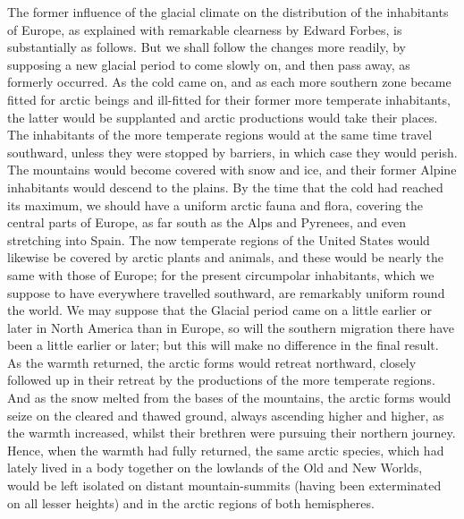 \indent The former influence of the glacial climate on the distribution of the inhabitants of Europe, as explained with remarkable clearness by Edward Forbes, is substantially as follows. But we shall follow the changes more readily, by supposing a new glacial period to come slowly on, and then pass away, as formerly occurred. As the cold came on, and as each more southern zone became fitted for arctic beings and ill-fitted for their former more temperate inhabitants, the latter would be supplanted and arctic productions would take their places. The inhabitants of the more temperate regions would at the same time travel southward, unless they were stopped by barriers, in which case they would perish. The mountains would become covered with snow and ice, and their former Alpine inhabitants would descend to the plains. By the time that the cold had reached its maximum, we should have a uniform arctic fauna and flora, covering the central parts of Europe, as far south as the Alps and Pyrenees, and even stretching into Spain. The now temperate regions of the United States would likewise be covered by arctic plants and animals, and these would be nearly the same with those of Europe; for the present circumpolar inhabitants, which we suppose to have everywhere travelled southward, are remarkably uniform round the world. We may suppose that the Glacial period came on a little earlier or later in North America than in Europe, so will the southern migration there have been a little earlier or later; but this will make no difference in the final result.~\\
\indent As the warmth returned, the arctic forms would retreat northward, closely followed up in their retreat by the productions of the more temperate regions. And as the snow melted from the bases of the mountains, the arctic forms would seize on the cleared and thawed ground, always ascending higher and higher, as the warmth increased, whilst their brethren were pursuing their northern journey.  Hence, when the warmth had fully returned, the same arctic species, which had lately lived in a body together on the lowlands of the Old and New Worlds, would be left isolated on distant mountain-summits (having been exterminated on all lesser heights) and in the arctic regions of both hemispheres.~\\
